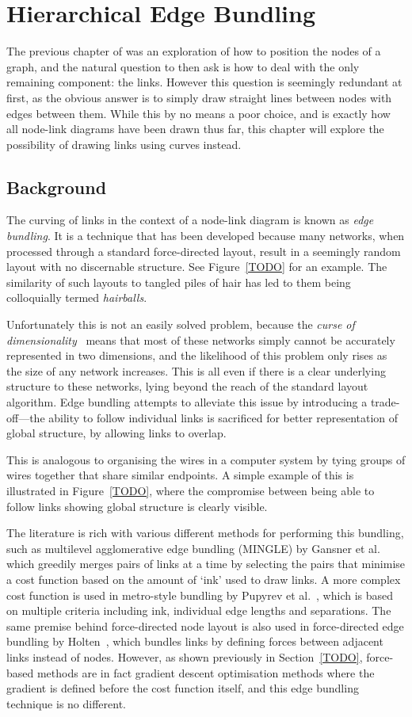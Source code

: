 \chapter{Hierarchical Edge Bundling}
The previous chapter of was an exploration of how to position the nodes of a graph, and the natural question to then ask is how to deal with the only remaining component: the links. However this question is seemingly redundant at first, as the obvious answer is to simply draw straight lines between nodes with edges between them. While this by no means a poor choice, and is exactly how all node-link diagrams have been drawn thus far, this chapter will explore the possibility of drawing links using curves instead.

\section{Background}
The curving of links in the context of a node-link diagram is known as \textit{edge bundling}. It is a technique that has been developed because many networks, when processed through a standard force-directed layout, result in a seemingly random layout with no discernable structure. See Figure~\ref{TODO} for an example. The similarity of such layouts to tangled piles of hair has led to them being colloquially termed \textit{hairballs}.

Unfortunately this is not an easily solved problem, because the \textit{curse of dimensionality}~\cite{TODO} means that most of these networks simply cannot be accurately represented in two dimensions, and the likelihood of this problem only rises as the size of any network increases. This is all even if there is a clear underlying structure to these networks, lying beyond the reach of the standard layout algorithm.
Edge bundling attempts to alleviate this issue by introducing a trade-off---the ability to follow individual links is sacrificed for better representation of global structure, by allowing links to overlap.

This is analogous to organising the wires in a computer system by tying groups of wires together that share similar endpoints. A simple example of this is illustrated in Figure~\ref{TODO}, where the compromise between being able to follow links showing global structure is clearly visible.

The literature is rich with various different methods for performing this bundling, such as multilevel agglomerative edge bundling (MINGLE) by Gansner et al.~\cite{TODO} which greedily merges pairs of links at a time by selecting the pairs that minimise a cost function based on the amount of `ink' used to draw links. A more complex cost function is used in metro-style bundling by Pupyrev et al.~\cite{TODO}, which is based on multiple criteria including ink, individual edge lengths and separations. 
The same premise behind force-directed node layout is also used in force-directed edge bundling by Holten~\cite{TODO}, which bundles links by defining forces between adjacent links instead of nodes. However, as shown previously in Section~\ref{TODO}, force-based methods are in fact gradient descent optimisation methods where the gradient is defined before the cost function itself, and this edge bundling technique is no different.

